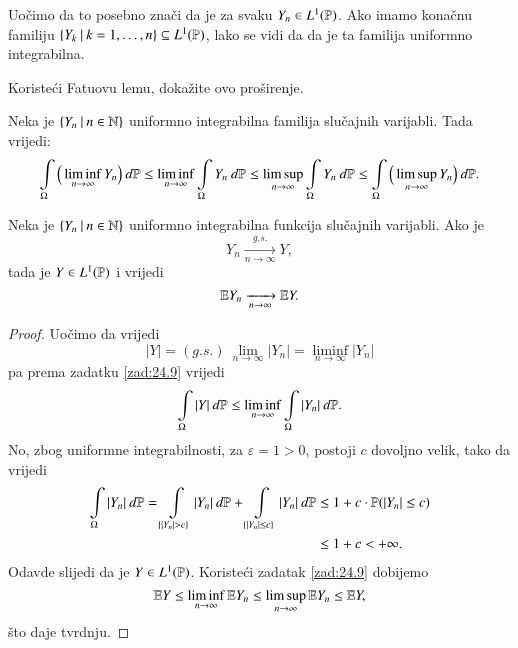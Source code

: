 Uo\v cimo da to posebno zna\v ci da je za svaku $Y_n \in L^1 (\mathbb{P})$.
Ako imamo kona\v cnu familiju $\{{Y_k} \: | \: {k = 1, \ldots, n}\} \subseteq L^1 (\mathbb{P})$, lako se vidi da da je ta familija uniformno integrabilna.

Koriste\' ci Fatuovu lemu, doka\v zite ovo pro\v sirenje.

\begin{zad}  \label{zad:24.9}
    Neka je $\{{Y_n} \: | \: {n \in \mathbb{N}}\}$ uniformno integrabilna familija slu\v cajnih varijabli.
    Tada vrijedi:
    \begin{equation*}
        \int\limits_\Omega \Big( \liminf\limits_{n \to \infty} Y_n \Big) \: d \mathbb{P} \leq \liminf\limits_{n \to \infty} \int\limits_\Omega Y_n \: d \mathbb{P} \leq \limsup\limits_{n \to \infty} \int\limits_\Omega Y_n \: d \mathbb{P} \leq \int\limits_\Omega \Big( \limsup\limits_{n \to \infty} Y_n \Big) \: d \mathbb{P}.
    \end{equation*}
\end{zad}

\begin{tm}  \label{tm:24.10}
    Neka je $\{{Y_n} \: | \: {n \in \mathbb{N}}\}$ uniformno integrabilna funkcija slu\v cajnih varijabli.
    Ako je
    \begin{equation*}
        Y_n \xrightarrow[n \to \infty]{g.s.} Y,
    \end{equation*}
    tada je $Y \in L^1 (\mathbb{P})$ i vrijedi
    \begin{equation*}
        \mathbb{E} Y_n \xrightarrow[n \to \infty]{} \mathbb{E} Y.
    \end{equation*}
\end{tm}

\begin{proof}
    Uo\v cimo da vrijedi
    \begin{equation*}
        |Y| = (g.s.) \: \lim\limits_{n \to \infty} |Y_n| = \liminf\limits_{n \to \infty} |Y_n|
    \end{equation*}
    pa prema zadatku \ref{zad:24.9} vrijedi
    \begin{equation*}
        \int\limits_\Omega |Y| \: d \mathbb{P} \leq \liminf\limits_{n \to \infty} \int\limits_\Omega |Y_n| \: d \mathbb{P}.
    \end{equation*}
    No, zbog uniformne integrabilnosti, za $\varepsilon = 1 > 0$, postoji $c$ dovoljno velik, tako da vrijedi
    \begin{equation}    \label{jed:24.11}
        \begin{aligned}
            \int\limits_\Omega |Y_n| \: d \mathbb{P} = \int\limits_{\{ |Y_n| > c \}} |Y_n| \: d \mathbb{P} + \int\limits_{\{ |Y_n| \leq c \}} |Y_n| \: d \mathbb{P} &\leq 1 + c \cdot \mathbb{P} (|Y_n| \leq c)\\
            &\leq 1 + c < +\infty.
        \end{aligned}
    \end{equation}
    Odavde slijedi da je $Y \in L^1 (\mathbb{P})$.
    Koriste\' ci zadatak \ref{zad:24.9} dobijemo
    \begin{equation*}
        \mathbb{E} Y \leq \liminf\limits_{n \to \infty} \mathbb{E} Y_n \leq \limsup\limits_{n \to \infty} \mathbb{E} Y_n \leq \mathbb{E} Y,
    \end{equation*}
    \v sto daje tvrdnju.
\end{proof}

